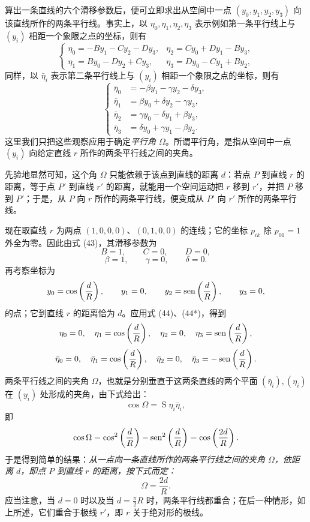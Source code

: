算出一条直线的六个滑移参数后，便可立即求出从空间中一点 \((y_0,y_1,y_2,y_3)\) 向该直线所作的两条平行线。事实上，以 \(\eta_0,\eta_1,\eta_2,\eta_3\) 表示例如第一条平行线上与 \((y_i)\) 相距一个象限之点的坐标，则有
\[
\tag{44}
\left\{
\begin{array}{ll}
\eta_0=-By_1-Cy_2-Dy_3,& \eta_2=Cy_0+Dy_1-By_3,\\
\eta_1=By_0-Dy_2+Cy_3,& \eta_3=Dy_0-Cy_1+By_2,
\end{array}\right.
\]
同样，以 \(\bar\eta_i\) 表示第二条平行线上与 \((y_i)\) 相距一个象限之点的坐标，则有
\[
\tag{44*}
\left\{
\begin{aligned}
\bar\eta_0&=-\beta y_1-\gamma y_2-\delta y_3,\\
\bar\eta_1&=\beta y_0+\delta y_2-\gamma y_3,\\
\bar\eta_2&=\gamma y_0-\delta y_1+\beta y_3,\\
\bar\eta_3&=\delta y_0+\gamma y_1-\beta y_2.
\end{aligned}\right.
\]
这里我们只把这些观察应用于确定\emph{平行角 \(\Omega\)}。所谓平行角，是指从空间中一点 \((y_i)\) 向给定直线 \(r\) 所作的两条平行线之间的夹角。

先验地显然可知，这个角 \(\Omega\) 只能依赖于该点到直线的距离 \(d\)：若点 \(P\) 到直线 \(r\) 的距离，等于点 \(P'\) 到直线 \(r'\) 的距离，就能用一个空间运动把 \(r\) 移到 \(r'\)，并把 \(P\) 移到 \(P'\)；于是，从 \(P\) 向 \(r\) 所作的两条平行线，便变成从 \(P'\) 向 \(r'\) 所作的两条平行线。

现在取直线 \(r\) 为两点 \((1,0,0,0)\)、\((0,1,0,0)\) 的连线；它的坐标 \(p_{ik}\) 除 \(p_{01}=1\) 外全为零。因此由式 (43)，其滑移参数为
\[
 B=1,
 \qquad C=0,
 \qquad D=0,
\]
\[
 \beta=1,
 \qquad \gamma=0,
 \qquad \delta=0.
\]
再考察坐标为
\[
 y_0=\cos\left(\frac dR\right),\qquad y_1=0,
 \qquad y_2=\operatorname{sen}\left(\frac dR\right),
 \qquad y_3=0,
\]
的点；它到直线 \(r\) 的距离恰为 \(d\)。应用式 (44)、(44*)，得到
\[
 \eta_0=0,
 \quad \eta_1=\cos\left(\frac dR\right),
 \quad \eta_2=0,
 \quad \eta_3=\operatorname{sen}\left(\frac dR\right),
\]
\[
 \bar\eta_0=0,
 \quad \bar\eta_1=\cos\left(\frac dR\right),
 \quad \bar\eta_2=0,
 \quad \bar\eta_3=-\operatorname{sen}\left(\frac dR\right).
\]
两条平行线之间的夹角 \(\Omega\)，也就是分别垂直于这两条直线的两个平面 \((\bar\eta_i),(\eta_i)\) 在 \((y_i)\) 处形成的夹角，由下式给出：
\[
 \cos\Omega=\mathop{\mathrm{S}}\eta_i\bar\eta_i,
\]
即
\[
 \cos\Omega=\cos^2\left(\frac dR\right)-\operatorname{sen}^2\left(\frac dR\right)=\cos\left(\frac{2d}R\right).
\]
于是得到简单的结果：\emph{从一点向一条直线所作的两条平行线之间的夹角 \(\Omega\)，依距离 \(d\)，即点 \(P\) 到直线 \(r\) 的距离，按下式而定：}
\[
 \Omega=\frac{2d}{R}.
\]
应当注意，当 \(d=0\) 时以及当 \(d=\frac\pi2R\) 时，两条平行线都重合；在后一种情形，如上所述，它们重合于极线 \(r'\)，即 \(r\) 关于绝对形的极线。
